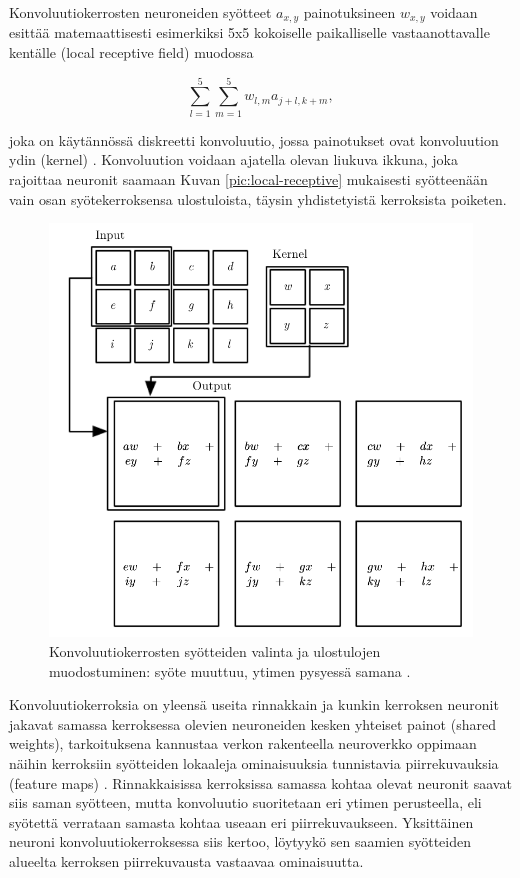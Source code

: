 \documentclass[finnish]{tktltiki2}
\theoremstyle{definition}
\theoremstyle{remark}
\begin{document}
    Konvoluutiokerrosten neuroneiden syötteet $a_{x,y}$ painotuksineen $w_{x,y}$ voidaan esittää matemaattisesti esimerkiksi 5x5 kokoiselle paikalliselle vastaanottavalle kentälle (local receptive field) muodossa

    $$ \sum_{l=1}^{5}\sum_{m=1}^{5} w_{l,m}a_{j+l,k+m},$$
    
    \noindent joka on käytännössä diskreetti konvoluutio, jossa painotukset ovat konvoluution ydin (kernel) \cite{lecun-et-al-98-convnets}. Konvoluution voidaan ajatella olevan liukuva ikkuna, joka rajoittaa neuronit saamaan Kuvan \ref{pic:local-receptive} mukaisesti syötteenään vain osan syötekerroksensa ulostuloista, täysin yhdistetyistä kerroksista poiketen. 

    \begin{figure}[h]
      \centering
      \includegraphics[scale=0.4]{convolution}
      \caption{Konvoluutiokerrosten syötteiden valinta ja ulostulojen muodostuminen: syöte muuttuu, ytimen pysyessä samana \cite{Goodfellow-et-al-2016}.}
      \label{pic:convolution}
    \end{figure}
    
    Konvoluutiokerroksia on yleensä useita rinnakkain ja kunkin kerroksen neuronit jakavat samassa kerroksessa olevien neuroneiden kesken yhteiset painot (shared weights), tarkoituksena kannustaa verkon rakenteella neuroverkko oppimaan näihin kerroksiin syötteiden lokaaleja ominaisuuksia tunnistavia piirrekuvauksia (feature maps) \cite{lecun-et-al-98-convnets}. Rinnakkaisissa kerroksissa samassa kohtaa olevat neuronit saavat siis saman syötteen, mutta konvoluutio suoritetaan eri ytimen perusteella, eli syötettä verrataan samasta kohtaa useaan eri piirrekuvaukseen. Yksittäinen neuroni konvoluutiokerroksessa siis kertoo, löytyykö sen saamien syötteiden alueelta kerroksen piirrekuvausta vastaavaa ominaisuutta.
    
\end{document}
